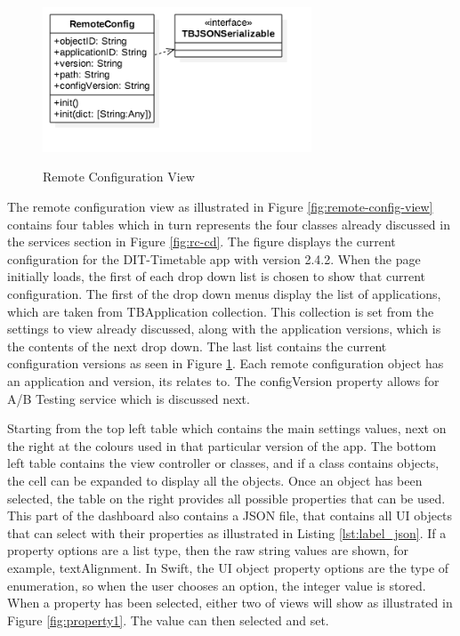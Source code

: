 \begin{figure}[!h]
    \caption{Remote Configuration View}
    \centering
    \includegraphics[width=80mm]{images/classdiagrams/RemoteConfig}
    \label{fig:remote-config-cd}
\end{figure} 

The remote configuration view as illustrated in Figure \ref{fig:remote-config-view} contains four tables which in turn represents the four classes already discussed in the services section in Figure \ref{fig:rc-cd}. The figure displays the current configuration for the DIT-Timetable app with version 2.4.2. When the page initially loads, the first of each drop down list is chosen to show that current configuration. The first of the drop down menus display the list of applications, which are taken from TBApplication collection. This collection is set from the settings to view already discussed, along with the application versions, which is the contents of the next drop down. The last list contains the current configuration versions as seen in Figure \ref{fig:remote-config-cd}. Each remote configuration object has an application and version, its relates to. The configVersion property allows for A/B Testing service which is discussed next.

Starting from the top left table which contains the main settings values, next on the right at the colours used in that particular version of the app. The bottom left table contains the view controller or classes, and if a class contains objects, the cell can be expanded to display all the objects. Once an object has been selected, the table on the right provides all possible properties that can be used. This part of the dashboard also contains a JSON file, that contains all UI objects that can select with their properties as illustrated in Listing \ref{lst:label_json}. If a property options are a list type, then the raw string values are shown, for example, textAlignment. In Swift, the UI object property options are the type of enumeration, so when the user chooses an option, the integer value is stored. When a property has been selected, either two of views will show as illustrated in Figure \ref{fig:property1}. The value can then selected and set.

